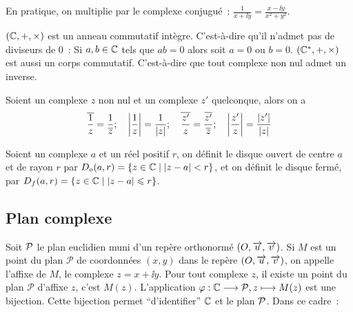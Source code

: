 En pratique, on multiplie par le complexe conjugué~: \(\frac{1}{x + \ii{}y} = 
\frac{x -\ii{}y}{x^2 + y^2}\).

\begin{prop}
  \((\C, + ,\times)\) est un anneau commutatif intègre. C'est-à-dire qu'il 
  n'admet pas de diviseurs de 0~: Si \(a, b \in{}\C\) tels que \(ab = 0\) alors 
  soit \(a = 0\) ou \(b = 0\).
  \((\C^*, + ,\times)\) est aussi un corps commutatif. C'est-à-dire que tout 
  complexe non nul admet un inverse.
\end{prop}

\begin{prop}
  Soient un complexe \(z\) non nul et un complexe \(z'\) quelconque, alors on 
  a
  \begin{equation}
    \bar{\frac{1}{z}} = \frac{1}{\bar{z}}; \quad \abs{\frac{1}{z}} = 
    \frac{1}{\abs{z}}; \quad
    \bar{\frac{z'}{z}} = \frac{\bar{z'}}{\bar{z}}; \quad \abs{\frac{z'}{z}} 
    = \frac{\abs{z'}}{\abs{z}}
  \end{equation}
\end{prop}

\begin{defdef}
  Soient un complexe \(a\) et un réel positif \(r\), on définit le disque 
  ouvert de centre \(a\) et de rayon \(r\) par \(D_o(a,r) = 
  \enstq{z\in\C}{\abs{z-a}<r}\), et on définit le disque fermé, par \(D_f(a,r) 
  = \enstq{z\in\C}{\abs{z-a}\leqslant r}\).
\end{defdef}

\subsection{Plan complexe}\label{subsec:plancomplexe}

Soit \(\P\) le plan euclidien muni d'un repère orthonormé \((O,\vect{u}, 
\vect{v})\). Si \(M\) est un point du plan \(\mathcal{P}\) de coordonnées 
\((x,y)\) dans le repère \((O,\vect{u}, \vect{v})\), on appelle l'affixe de 
\(M\), le complexe \(z = x + \ii{}y\). Pour tout complexe \(z\), il existe un 
point du plan \(\mathcal{P}\) d'affixe \(z\), c'est \(M(z)\). L'application 
\(\fonctionL{\varphi}{\C}{\P}{z}{M(z)}\) est une bijection. Cette bijection 
permet ``d'identifier'' \(\C\) et le plan \(\P\). Dans ce cadre~:


